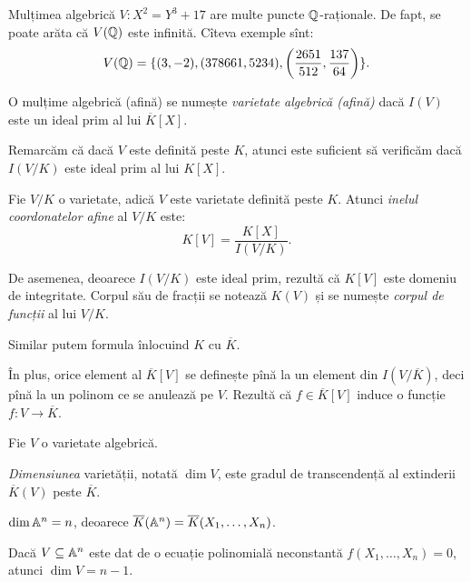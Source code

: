 \begin{example}\label{exm:multime-alg3}
  Mulțimea algebrică $ V: X^2 = Y^3 + 17 $ are multe puncte $ \mathbb{Q} $-raționale.
  De fapt, se poate arăta că $ V(\mathbb{Q}) $ este infinită. Cîteva exemple sînt:
  \[
    V(\mathbb{Q}) = \{ (3, -2), (378661, 5234), \left( \dfrac{2651}{512}, \dfrac{137}{64} \right) \}.
  \]
\end{example}

\begin{definition}\label{def:varietate-afina}
  O mulțime algebrică (afină) se numește \emph{varietate algebrică (afină)} dacă $ I(V) $ este
  un ideal prim al lui $ \overline{K}[X] $.
\end{definition}

Remarcăm că dacă $ V $ este definită peste $ K $, atunci este suficient să verificăm dacă
$ I(V/K) $ este ideal prim al lui $ K[X] $.

Fie $ V/K $ o varietate, adică $ V $ este varietate definită peste $ K $. Atunci
\emph{inelul coordonatelor afine} al $ V/K $ este:
\[
  K[V] = \dfrac{K[X]}{I(V/K)}.
\]

De asemenea, deoarece $ I(V/K) $ este ideal prim, rezultă că $ K[V] $ este
domeniu de integritate. Corpul său de fracții se notează $ K(V) $ și se numește
\emph{corpul de funcții} al lui $ V/K $.

Similar putem formula înlocuind $ K $ cu $ \overline{K} $.

În plus, orice element al $ \overline{K}[V] $ se definește pînă la un element din
$ I(V/\overline{K}) $, deci pînă la un polinom ce se anulează pe $ V $. Rezultă
că $ f \in \overline{K}[V] $ induce o funcție $ f : V \to \overline{K} $.

\begin{definition}\label{def:varietate-alg-dim}
  Fie $ V $ o varietate algebrică.

  \emph{Dimensiunea} varietății, notată $ \dim V $, este gradul de transcendență
  al extinderii $ \overline{K}(V) $ peste $ \overline{K} $.
\end{definition}

\begin{example}\label{exm:dim}
  $ \dim\mathbb{A}^n = n $, deoarece $ \overline{K}(\mathbb{A}^n) = \overline{K}(X_1, \dots, X_n) $.

  Dacă $ V \subseteq \mathbb{A}^n $ este dat de o ecuație polinomială neconstantă $ f(X_1, \dots, X_n) = 0 $,
  atunci $ \dim V = n - 1 $.
\end{example}

